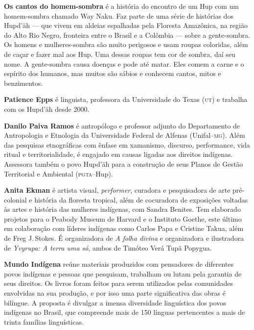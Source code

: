 \textbf{Os cantos do homem-sombra} é a história do encontro de um Hup com um homem-sombra chamado Way Naku. Faz parte de uma série de histórias dos Hupd'äh --- que vivem em aldeias espalhadas pela Floresta Amazônica, na região do Alto Rio Negro, fronteira entre o Brasil e a Colômbia --- sobre a gente-sombra. Os homens e mulheres-sombra são muito perigosos e usam roupas coloridas, além de caçar e fazer mal aos Hup. Uma dessas roupas tem cor de sombra, daí seu nome. A gente-sombra causa doenças e pode até matar. Eles comem a carne e o espírito dos humanos, mas muitos são sábios e conhecem cantos, mitos e benzimentos.

\textbf{Patience Epps} é linguista, professora da Universidade do Texas (\textsc{ut}) e trabalha com os Hupd'äh desde 2000.

\textbf{Danilo Paiva Ramos} é antropólogo e professor adjunto do Departamento de Antropologia e Etnologia da Universidade Federal de Alfenas (Unifal--\textsc{mg}). Além das pesquisas etnográficas com ênfase em xamanismo, discurso, performance, vida ritual e territorialidade, é engajado em causas ligadas aos direitos indígenas. Assessora também o povo Hupd'äh para a construção de seus Planos de Gestão Territorial e Ambiental (\textsc{pgta}--Hup).

\textbf{Anita Ekman} é artista visual, \textit{performer}, curadora e
 pesquisadora de arte pré-colonial e história da floresta tropical, além de
 cocuradora de exposições voltadas às artes e história das mulheres
 indígenas, com Sandra Benites. Tem elaborado projetos para o Peabody Museum
 de Harvard e o Instituto Goethe, este último em colaboração com líderes
 indígenas como Carlos Papa e Cristine Takua, além de Freg J.\,Stokes. É
 organizadora de \textit{A folha divina} e organizadora e ilustradora
 de \textit{Yvyrupa: A terra uma só}, ambos de Timóteo Verá Tupã Popygua.

\textbf{Mundo Indígena} reúne materiais produzidos com pensadores de diferentes povos indígenas e pessoas que pesquisam, trabalham ou lutam pela garantia de seus direitos. Os livros foram feitos para serem utilizados pelas comunidades envolvidas na sua produção, e por isso uma parte significativa das obras é bilíngue. A proposta é divulgar a imensa diversidade linguística dos povos indígenas no Brasil, que compreende mais de 150 línguas pertencentes a mais de trinta famílias linguísticas.


